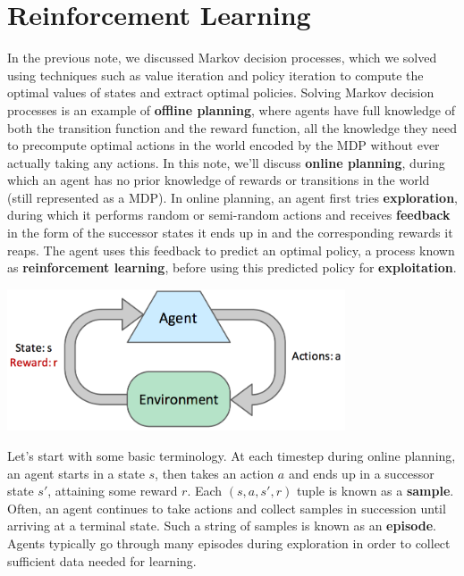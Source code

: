 \documentclass[11pt,fleqn]{article}
\def\title{Note \the\lecturenumber}
\begin{document}
\maketitle

\section*{Reinforcement Learning}
In the previous note, we discussed Markov decision processes, which we solved using techniques such as value iteration and policy iteration to compute the optimal values of states and extract optimal policies. Solving Markov decision processes is an example of \textbf{offline planning}, where agents have full knowledge of both the transition function and the reward function, all the knowledge they need to precompute optimal actions in the world encoded by the MDP without ever actually taking any actions. In this note, we'll discuss \textbf{online planning}, during which an agent has no prior knowledge of rewards or transitions in the world (still represented as a MDP). In online planning, an agent first tries \textbf{exploration}, during which it performs random or semi-random actions and receives \textbf{feedback} in the form of the successor states it ends up in and the corresponding rewards it reaps. The agent uses this feedback to predict an optimal policy, a process known as \textbf{reinforcement learning}, before using this predicted policy for \textbf{exploitation}.
\begin{center}	
	\includegraphics[width=10cm]{img/feedback-loop}
\end{center}
Let's start with some basic terminology. At each timestep during online planning, an agent starts in a state $s$, then takes an action $a$ and ends up in a successor state $s'$, attaining some reward $r$. Each $(s, a, s', r)$ tuple is known as a \textbf{sample}. Often, an agent continues to take actions and collect samples in succession until arriving at a terminal state. Such a string of samples is known as an \textbf{episode}. Agents typically go through many episodes during exploration in order to collect sufficient data needed for learning.


\end{document}
\end{document}
